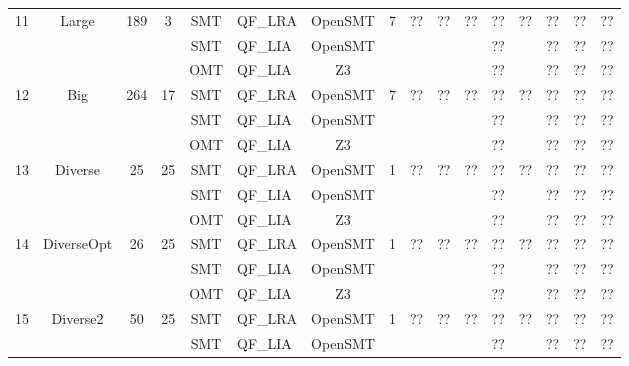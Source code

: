 \begin{landscape}
\begin{longtable}{|c|c|c|c|c|l|c|c|c|c|c|c|c|c|c|c|}
            \multirow{3}{*}{11} & \multirow{3}{*}{Large} & \multirow{3}{*}{189} & \multirow{3}{*}{3} & SMT & QF\_LRA & OpenSMT & \multirow{3}{*}{7} & \multirow{3}{*}{??} & \multirow{3}{*}{??} & \multirow{3}{*}{??} & ?? & \multirow{3}{*}{??} & ?? & ?? & ?? \\
            & & & & SMT & QF\_LIA & OpenSMT & & & & & ?? & & ?? & ?? & ?? \\
            & & & & OMT & QF\_LIA & Z3 & & & & & ?? & & ?? & ?? & ?? \\
            \hline
            \multirow{3}{*}{12} & \multirow{3}{*}{Big} & \multirow{3}{*}{264} & \multirow{3}{*}{17} & SMT & QF\_LRA & OpenSMT & \multirow{3}{*}{7} & \multirow{3}{*}{??} & \multirow{3}{*}{??} & \multirow{3}{*}{??} & ?? & \multirow{3}{*}{??} & ?? & ?? & ?? \\
            & & & & SMT & QF\_LIA & OpenSMT & & & & & ?? & & ?? & ?? & ?? \\
            & & & & OMT & QF\_LIA & Z3 & & & & & ?? & & ?? & ?? & ?? \\
            \hline
            \multirow{3}{*}{13} & \multirow{3}{*}{Diverse} & \multirow{3}{*}{25} & \multirow{3}{*}{25} & SMT & QF\_LRA & OpenSMT & \multirow{3}{*}{1} & \multirow{3}{*}{??} & \multirow{3}{*}{??} & \multirow{3}{*}{??} & ?? & \multirow{3}{*}{??} & ?? & ?? & ?? \\
            & & & & SMT & QF\_LIA & OpenSMT & & & & & ?? & & ?? & ?? & ?? \\
            & & & & OMT & QF\_LIA & Z3 & & & & & ?? & & ?? & ?? & ?? \\
            \hline
            \multirow{3}{*}{14} & \multirow{3}{*}{DiverseOpt} & \multirow{3}{*}{26} & \multirow{3}{*}{25} & SMT & QF\_LRA & OpenSMT & \multirow{3}{*}{1} & \multirow{3}{*}{??} & \multirow{3}{*}{??} & \multirow{3}{*}{??} & ?? & \multirow{3}{*}{??} & ?? & ?? & ?? \\
            & & & & SMT & QF\_LIA & OpenSMT & & & & & ?? & & ?? & ?? & ?? \\
            & & & & OMT & QF\_LIA & Z3 & & & & & ?? & & ?? & ?? & ?? \\
            \hline
            \multirow{3}{*}{15} & \multirow{3}{*}{Diverse2} & \multirow{3}{*}{50} & \multirow{3}{*}{25} & SMT & QF\_LRA & OpenSMT & \multirow{3}{*}{1} & \multirow{3}{*}{??} & \multirow{3}{*}{??} & \multirow{3}{*}{??} & ?? & \multirow{3}{*}{??} & ?? & ?? & ?? \\
            & & & & SMT & QF\_LIA & OpenSMT & & & & & ?? & & ?? & ?? & ?? \\

\end{longtable}
\end{landscape}
